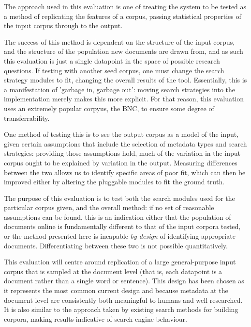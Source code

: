 

The approach used in this evaluation is one of treating the system to be tested as a method of replicating the features of a corpus, passing statistical properties of the input corpus through to the output.

The success of this method is dependent on the structure of the input corpus, and the structure of the population new documents are drawn from, and as such this evaluation is just a single datapoint in the space of possible research questions.  If testing with another seed corpus, one must change the search strategy modules to fit, changing the overall results of the tool.  Essentially, this is a manifestation of 'garbage in, garbage out': moving search strategies into the implementation merely makes this more explicit.  For that reason, this evaluation uses an extremely popular corpyus, the BNC, to ensure some degree of transferrability.

One method of testing this is to see the output corpus as a model of the input, given certain assumptions that include the selection of metadata types and search strategies: providing those assumptions hold, much of the variation in the input corpus ought to be explained by variation in the output.  Measuring differences between the two allows us to identify specific areas of poor fit, which can then be improved either by altering the pluggable modules to fit the ground truth.

The purpose of this evaluation is to test both the search modules used for the particular corpus given, and the overall method: if no set of reasonable assumptions can be found, this is an indication either that the population of documents online is fundamentally different to that of the input corpora tested, or the method presented here is incapable \textsl{by design} of identifying appropriate documents.  Differentiating between these two is not possible quantitatively.


This evaluation will centre around replication of a large general-purpose input corpus that is sampled at the document level (that is, each datapoint is a document rather than a single word or sentence).  This design has been chosen as it represents the most common current design and because metadata at the document level are consistently both meaningful to humans and well researched.  It is also similar to the approach taken by existing search methods for building corpora, making results indicative of search engine behaviour.


